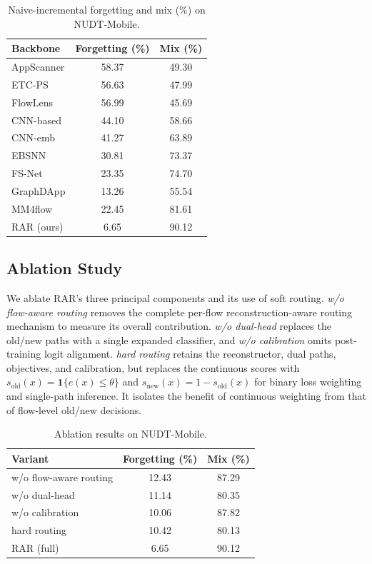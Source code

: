 \begin{table}[t]
\caption{Naive-incremental forgetting and mix (\%) on NUDT-Mobile.}
\label{tab:eval-b-forgetting}
\centering
\small
\begin{tabular}{lcc}
\toprule
Backbone & Forgetting (\%) & Mix (\%) \\
\midrule
AppScanner          & 58.37 & 49.30 \\
ETC-PS              & 56.63 & 47.99 \\
FlowLens            & 56.99 & 45.69 \\
CNN-based           & 44.10 & 58.66 \\
CNN-emb             & 41.27 & 63.89 \\
EBSNN               & 30.81 & 73.37 \\
FS-Net              & 23.35 & 74.70 \\
GraphDApp           & 13.26 & 55.54 \\
MM4flow             & 22.45 & 81.61 \\
\midrule
RAR (ours)          & 6.65 & 90.12 \\
\bottomrule
\end{tabular}
\end{table}

\subsection{Ablation Study}

We ablate RAR's three principal components and its use of soft routing. \emph{w/o flow-aware routing} removes the complete per-flow reconstruction-aware routing mechanism to measure its overall contribution. \emph{w/o dual-head} replaces the old/new paths with a single expanded classifier, and \emph{w/o calibration} omits post-training logit alignment. \emph{hard routing} retains the reconstructor, dual paths, objectives, and calibration, but replaces the continuous scores with $s_{\mathrm{old}}(x)=\mathbf{1}\{e(x)\leq\theta\}$ and $s_{\mathrm{new}}(x)=1-s_{\mathrm{old}}(x)$ for binary loss weighting and single-path inference. It isolates the benefit of continuous weighting from that of flow-level old/new decisions.

\begin{table}[t]
\caption{Ablation results on NUDT-Mobile.}
\label{tab:ablation}
\centering
\small
\begin{tabular}{lcc}
\toprule
Variant & Forgetting (\%) & Mix (\%) \\
\midrule
w/o flow-aware routing & 12.43 & 87.29 \\
w/o dual-head     & 11.14 & 80.35 \\
w/o calibration   & 10.06 & 87.82 \\
hard routing      & 10.42 & 80.13 \\
\midrule
RAR (full)        & 6.65  & 90.12 \\
\bottomrule
\end{tabular}
\end{table}

